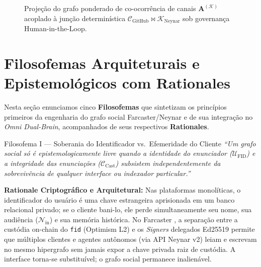 \documentclass[11pt,a4paper]{article}
\begin{document}
\begin{figure}[htbp]
\caption{Projeção do grafo ponderado de co-ocorrência de canais $\mathbf{A}^{(\mathcal{K})}$ acoplado à junção determinística $\mathcal{C}_{\text{GitHub}} \bowtie \mathcal{K}_{\text{Neynar}}$ sob governança Human-in-the-Loop.}
\label{fig:cooccurrence}
\end{figure}

\section{Filosofemas Arquiteturais e Epistemológicos com Rationales}

Nesta seção enunciamos cinco \textbf{Filosofemas} que sintetizam os princípios primeiros da engenharia do grafo social Farcaster/Neynar e de sua integração no \emph{Omni Dual-Brain}, acompanhados de seus respectivos \textbf{Rationales}.

\begin{filosofema}{Filosofema I --- Soberania do Identificador vs.\ Efemeridade do Cliente}
\emph{``Um grafo social só é epistemologicamente livre quando a identidade do enunciador ($\mathcal{U}_{\text{FID}}$) e a integridade das enunciações ($\mathcal{C}_{\text{Cast}}$) subsistem independentemente da sobrevivência de qualquer interface ou indexador particular.''}

\medskip
\noindent\textbf{Rationale Criptográfico e Arquitetural:}
Nas plataformas monolíticas, o identificador do usuário é uma chave estrangeira aprisionada em um banco relacional privado; se o cliente bani-lo, ele perde simultaneamente seu nome, sua audiência ($\mathcal{N}_{\text{in}}$) e sua memória histórica. No Farcaster \cite{srinivasan2022farcaster}, a separação entre a custódia on-chain do \texttt{fid} (Optimism L2) e os \emph{Signers} delegados Ed25519 permite que múltiplos clientes e agentes autônomos (via API Neynar v2) leiam e escrevam no mesmo hipergrafo sem jamais expor a chave privada raiz de custódia. A interface torna-se substituível; o grafo social permanece inalienável.
\end{filosofema}
\end{document}

